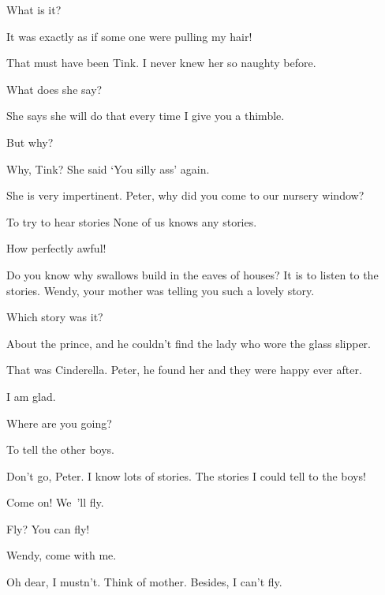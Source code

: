 \begin{drama}
\peterspeaks
What is it?

\wendyspeaks
It was exactly as if some one were pulling my hair!

\peterspeaks
That must have been Tink.
I never knew her so naughty before.


\wendyspeaks
What does she say?

\peterspeaks
She says she will do that every time I give you a thimble.

\wendyspeaks
But why?

Why, Tink?
She said ‘You silly ass’ again.

\wendyspeaks
She is very impertinent.
Peter, why did you come to our nursery window?

\peterspeaks
To try to hear stories None of us knows any stories.

\wendyspeaks
How perfectly awful!

\peterspeaks
Do you know why swallows build in the eaves of houses?
It is to listen to the stories.
Wendy, your mother was telling you such a lovely story.

\wendyspeaks
Which story was it?

\peterspeaks
About the prince, and he couldn’t find the lady who wore the glass slipper.

\wendyspeaks
That was Cinderella.
Peter, he found her and they were happy ever after.

\peterspeaks
I am glad.

\wendyspeaks
Where are you going?

To tell the other boys.

\wendyspeaks
Don’t go, Peter.
I know lots of stories.
The stories I could tell to the boys!

Come on!
We~’ll fly.

\wendyspeaks
Fly?
You can fly!


\peterspeaks
Wendy, come with me.

\wendyspeaks
Oh dear, I mustn’t.
Think of mother.
Besides, I can’t fly.


\end{drama}
